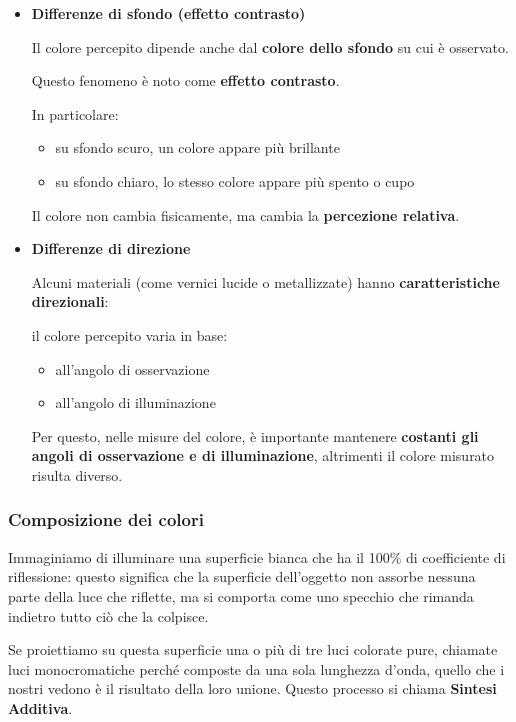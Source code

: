 \documentclass[
]{article}
\providecommand{\tightlist}{%
  \setlength{\itemsep}{0pt}\setlength{\parskip}{0pt}}
\begin{document}
\begin{itemize}
  Il colore è lo stesso, cambia solo la superficie che lo contiene.
\item
  \textbf{Differenze di sfondo (effetto contrasto)}

  Il colore percepito dipende anche dal \textbf{colore dello sfondo} su cui è osservato.

  Questo fenomeno è noto come \textbf{effetto contrasto}.

  In particolare:

  \begin{itemize}
  \tightlist
  \item
    su sfondo scuro, un colore appare più brillante
  \item
    su sfondo chiaro, lo stesso colore appare più spento o cupo
  \end{itemize}

  Il colore non cambia fisicamente, ma cambia la \textbf{percezione relativa}.
\item
  \textbf{Differenze di direzione}

  Alcuni materiali (come vernici lucide o metallizzate) hanno \textbf{caratteristiche direzionali}:

  il colore percepito varia in base:

  \begin{itemize}
  \tightlist
  \item
    all'angolo di osservazione
  \item
    all'angolo di illuminazione
  \end{itemize}

  Per questo, nelle misure del colore, è importante mantenere \textbf{costanti gli angoli di osservazione e di illuminazione}, altrimenti il colore misurato risulta diverso.
\end{itemize}

\hypertarget{composizione-dei-colori}{%
\subsubsection{Composizione dei colori}\label{composizione-dei-colori}}

Immaginiamo di illuminare una superficie bianca che ha il 100\% di coefficiente di riflessione: questo significa che la superficie dell'oggetto non assorbe nessuna parte della luce che riflette, ma si comporta come uno specchio che rimanda indietro tutto ciò che la colpisce.

Se proiettiamo su questa superficie una o più di tre luci colorate pure, chiamate luci monocromatiche perché composte da una sola lunghezza d'onda, quello che i nostri vedono è il risultato della loro unione. Questo processo si chiama \textbf{Sintesi Additiva}.
\end{document}
